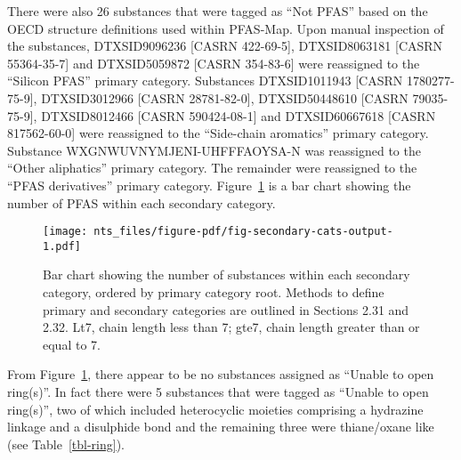 \documentclass[
  super,
  preprint,
  3p]{elsarticle}
\begin{document}
There were also 26 substances that were tagged as ``Not PFAS'' based on
the OECD structure definitions used within PFAS-Map. Upon manual
inspection of the substances, DTXSID9096236 {[}CASRN 422-69-5{]},
DTXSID8063181 {[}CASRN 55364-35-7{]} and DTXSID5059872 {[}CASRN
354-83-6{]} were reassigned to the ``Silicon PFAS'' primary category.
Substances DTXSID1011943 {[}CASRN 1780277-75-9{]}, DTXSID3012966
{[}CASRN 28781-82-0{]}, DTXSID50448610 {[}CASRN 79035-75-9{]},
DTXSID8012466 {[}CASRN 590424-08-1{]} and DTXSID60667618 {[}CASRN
817562-60-0{]} were reassigned to the ``Side-chain aromatics'' primary
category. Substance WXGNWUVNYMJENI-UHFFFAOYSA-N was reassigned to the
``Other aliphatics'' primary category. The remainder were reassigned to
the ``PFAS derivatives'' primary category.
Figure~\ref{fig-secondary-cats} is a bar chart showing the number of
PFAS within each secondary category.

\begin{figure}

{\centering \texttt{[image: nts\_files/figure-pdf/fig-secondary-cats-output-1.pdf]}

}

\caption{\label{fig-secondary-cats}Bar chart showing the number of
substances within each secondary category, ordered by primary category
root. Methods to define primary and secondary categories are outlined in
Sections 2.31 and 2.32. Lt7, chain length less than 7; gte7, chain
length greater than or equal to 7.}

\end{figure}

From Figure~\ref{fig-secondary-cats}, there appear to be no substances
assigned as ``Unable to open ring(s)''. In fact there were 5 substances
that were tagged as ``Unable to open ring(s)'', two of which included
heterocyclic moieties comprising a hydrazine linkage and a disulphide
bond and the remaining three were thiane/oxane like (see
Table~\ref{tbl-ring}).
\end{document}
